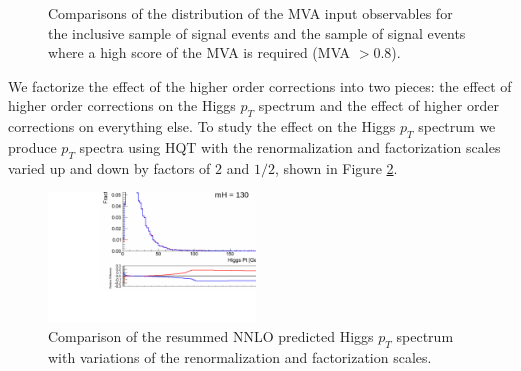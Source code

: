 \begin{figure}[!htbp]
\begin{center}
\caption{Comparisons of the distribution of the MVA input observables for the
inclusive sample of signal events and the sample of signal events where a
high score of the MVA is required (MVA $>0.8$).
}
\label{fig:MVAHighScorePhaseSpaceRegion}
\end{center}
\end{figure}

We factorize the effect of the higher order corrections into two
pieces: the effect of higher order corrections on the Higgs $p_{T}$ spectrum
and the effect of higher order corrections on everything else. To study the
effect on the Higgs $p_{T}$ spectrum we produce $p_{T}$ spectra using HQT
with the renormalization and factorization scales varied up and down by factors 
of $2$ and $1/2$, shown in Figure \ref{fig:signalshape_PtSpectrumScaleVariation_HiggsPt}.

\begin{figure}[!htbp]
\begin{center}
\includegraphics[width=0.49\textwidth]{figures/ShapeSystematics_HWW_HiggsPt_HQTScaleVariation.pdf}
\caption{Comparison of the resummed NNLO predicted Higgs $p_{T}$ spectrum with variations of
the renormalization and factorization scales.
}
\label{fig:signalshape_PtSpectrumScaleVariation_HiggsPt}
\end{center}
\end{figure}


